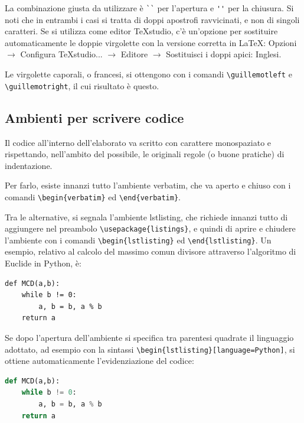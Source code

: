 La combinazione giusta da utilizzare è \verb|``| per l'apertura e \verb|''| per la chiusura. Si noti che in entrambi i casi si tratta di doppi apostrofi ravvicinati, e non di singoli caratteri. Se si utilizza come editor TeXstudio, c'è un'opzione per sostituire automaticamente le doppie virgolette con la versione corretta in \LaTeX: Opzioni $\rightarrow$ Configura TeXstudio... $\rightarrow$ Editore $\rightarrow$ Sostituisci i doppi apici: Inglesi.

Le virgolette caporali, o francesi, si ottengono con i comandi \verb|\guillemotleft| e \break\verb|\guillemotright|, il cui risultato è \guillemotleft questo\guillemotright.


\subsection{Ambienti per scrivere codice}

Il codice all'interno dell'elaborato va scritto con carattere monospaziato e rispettando, nell'ambito del possibile, le originali regole (o buone pratiche) di indentazione.

Per farlo, esiste innanzi tutto l'ambiente verbatim, che va aperto e chiuso con i comandi \verb|\begin{verbatim}| ed \verb|\end{verbatim}|.

Tra le alternative, si segnala l'ambiente lstlisting, che richiede innanzi tutto di aggiungere nel preambolo \verb|\usepackage{listings}|, e quindi di aprire e chiudere l'ambiente con i comandi \verb|\begin{lstlisting}| ed \verb|\end{lstlisting}|. Un esempio, relativo al calcolo del massimo comun divisore attraverso l'algoritmo di Euclide in Python, è:

\begin{lstlisting}
def MCD(a,b):
	while b != 0:
		a, b = b, a % b
	return a
\end{lstlisting}

Se dopo l'apertura dell'ambiente si specifica tra parentesi quadrate il linguaggio adottato, ad esempio con la sintassi \verb|\begin{lstlisting}[language=Python]|, si ottiene automaticamente l'evidenziazione del codice:

\begin{lstlisting}[language=Python]
def MCD(a,b):
	while b != 0:
		a, b = b, a % b
	return a
\end{lstlisting}

